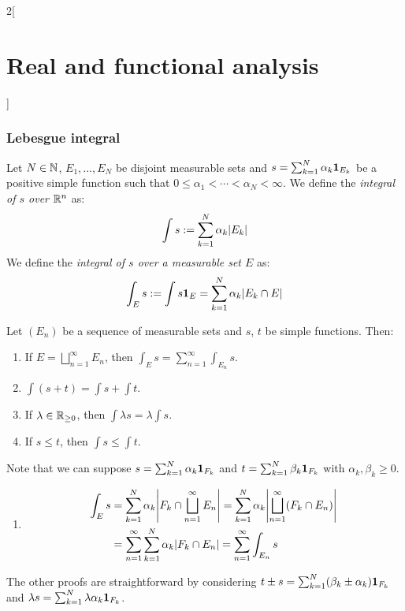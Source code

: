 \documentclass[../../../main_math.tex]{subfiles}
\begin{document}
\begin{multicols}{2}[\section{Real and functional analysis}]
  \subsubsection{Lebesgue integral}
  \begin{definition}
    Let $N\in\mathbb{N}$, $E_1,\ldots,E_N$ be disjoint measurable sets and $s=\sum_{k=1}^N\alpha_k\boldsymbol{\mathrm{1}}_{E_k}$ be a positive simple function such that $0\leq\alpha_1<\cdots<\alpha_N<\infty$. We define the \emph{integral of $s$ over $\mathbb{R}^n$} as: $$\int s:=\sum_{k=1}^N\alpha_k\m{E_k}$$
    We define the \emph{integral of $s$ over a measurable set $E$} as: $$\int_E s:=\int s\indi{E}=\sum_{k=1}^N\alpha_k\m{E_k\cap E}$$
  \end{definition}
  \begin{proposition}
    Let $(E_n)$ be a sequence of measurable sets and $s$, $t$ be simple functions. Then:
    \begin{enumerate}
      \item\label{RFA_proofsigma} If $\displaystyle E=\bigsqcup_{n=1}^\infty E_n$, then $\displaystyle\int_E s=\sum_{n=1}^\infty \int_{E_n} s$.
      \item $\displaystyle\int(s+t)=\int s+\int t$.
      \item If $\lambda\in\mathbb{R}_{\geq 0}$, then $\displaystyle\int \lambda s=\lambda\int s$.
      \item If $s\leq t$, then $\displaystyle\int s\leq\int t$.
    \end{enumerate}
  \end{proposition}
  \begin{sproof}
    Note that we can suppose $s=\sum_{k=1}^N\alpha_k\boldsymbol{\mathrm{1}}_{F_k}$ and $t=\sum_{k=1}^N\beta_k\boldsymbol{\mathrm{1}}_{F_k}$ with $\alpha_k,\beta_k\geq 0$.
    \begin{enumerate}
      \item
            \begin{align*}
              \int_E s & =\sum_{k=1}^N\alpha_k\m{F_k\cap \bigsqcup_{n=1}^\infty E_n}= \sum_{k=1}^N\alpha_k\m{\bigsqcup_{n=1}^\infty(F_k\cap E_n)} \\
                       & =\sum_{n=1}^\infty\sum_{k=1}^N\alpha_k\m{F_k\cap E_n}=\sum_{n=1}^\infty \int_{E_n} s
            \end{align*}
    \end{enumerate}
    The other proofs are straightforward by considering $t\pm s = \sum_{k=1}^N(\beta_k\pm \alpha_k)\boldsymbol{\mathrm{1}}_{F_k}$ and $\lambda s=\sum_{k=1}^N\lambda\alpha_k\boldsymbol{\mathrm{1}}_{F_k}$.
  \end{sproof}
  \begin{proposition}

\end{proposition}
\end{multicols}
\end{document}
